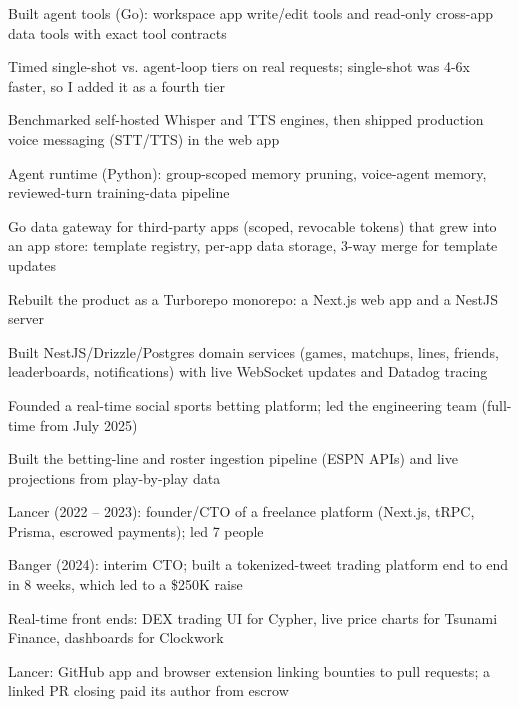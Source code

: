 \documentclass[print]{jack-resume}
\begin{document}
\begin{tightemize}
    \item Built agent tools (Go): workspace app write/edit tools and read-only cross-app data tools with exact tool contracts
    \item Timed single-shot vs. agent-loop tiers on real requests; single-shot was 4-6x faster, so I added it as a fourth tier
    \item Benchmarked self-hosted Whisper and TTS engines, then shipped production voice messaging (STT/TTS) in the web app
    \item Agent runtime (Python): group-scoped memory pruning, voice-agent memory, reviewed-turn training-data pipeline
    \item Go data gateway for third-party apps (scoped, revocable tokens) that grew into an app store: template registry, per-app data storage, 3-way merge for template updates
\end{tightemize}
\sectionsep

\begin{tightemize}
    \item Rebuilt the product as a Turborepo monorepo: a Next.js web app and a NestJS server
    \item Built NestJS/Drizzle/Postgres domain services (games, matchups, lines, friends, leaderboards, notifications) with live WebSocket updates and Datadog tracing
    \item Founded a real-time social sports betting platform; led the engineering team (full-time from July 2025)
    \item Built the betting-line and roster ingestion pipeline (ESPN APIs) and live projections from play-by-play data
\end{tightemize}
\sectionsep

\begin{tightemize}
    \item Lancer (2022 -- 2023): founder/CTO of a freelance platform (Next.js, tRPC, Prisma, escrowed payments); led 7 people
    \item Banger (2024): interim CTO; built a tokenized-tweet trading platform end to end in 8 weeks, which led to a \$250K raise
    \item Real-time front ends: DEX trading UI for Cypher, live price charts for Tsunami Finance, dashboards for Clockwork
    \item Lancer: GitHub app and browser extension linking bounties to pull requests; a linked PR closing paid its author from escrow
\end{tightemize}
\sectionsep
\end{document}
